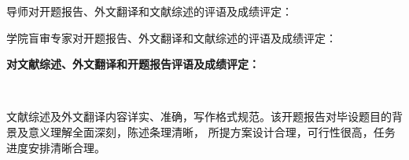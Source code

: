\cleardoublepage

{
    \bfseries

    {
        \noindent 导师对开题报告、外文翻译和文献综述的评语及成绩评定：
    }


    \vspace{50mm}
    \thesisproposaleval[10][15][5]
    \signature{导师签名}

    {
        \noindent 学院盲审专家对开题报告、外文翻译和文献综述的评语及成绩评定：
    }


    \mbox{} \vfill
    \thesisproposaleval
    \signature{开题报告审核负责人（签名/签章）}
}
{

    {
        \bfseries
        \noindent 对文献综述、外文翻译和开题报告评语及成绩评定： 
        
    }

    ~
    ~

    {
    \fangsong
    文献综述及外文翻译内容详实、准确，写作格式规范。该开题报告对毕设题目的背景及意义理解全面深刻，陈述条理清晰，
    所提方案设计合理，可行性很高，任务进度安排清晰合理。
    }
    \bfseries
    \mbox{} \vfill
    \thesisproposaleval
    \signature{开题报告答辩小组负责人（签名）}
}
